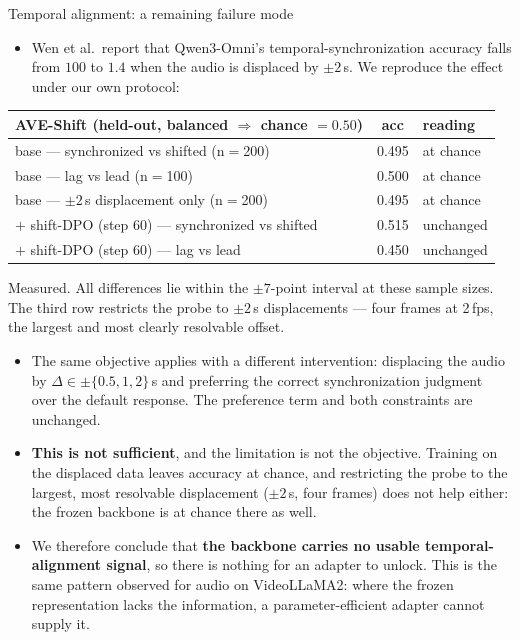 \documentclass[aspectratio=169,11pt]{beamer}
\begin{document}
\begin{frame}{Temporal alignment: a remaining failure mode}
\begin{itemize}\footnotesize
\item Wen et al.\ report that Qwen3-Omni's temporal-synchronization accuracy falls from $100$ to
$1.4$ when the audio is displaced by $\pm2$\,s. We reproduce the effect under our own protocol:
\end{itemize}
\vspace{0.2em}
\centering
\renewcommand{\arraystretch}{1.2}
\footnotesize
\begin{tabular}{l c l}
\toprule
AVE-Shift (held-out, balanced $\Rightarrow$ chance $=0.50$) & acc & reading \\
\midrule
base --- synchronized vs shifted (n$=$200) & 0.495 & at chance \\
base --- lag vs lead (n$=$100)       & 0.500 & at chance \\
base --- $\pm2$\,s displacement only (n$=$200) & 0.495 & at chance \\
\midrule
$+$ shift-DPO (step 60) --- synchronized vs shifted & 0.515 & unchanged \\
$+$ shift-DPO (step 60) --- lag vs lead & 0.450 & unchanged \\
\bottomrule
\end{tabular}
\par\vspace{0.3em}
{\scriptsize Measured. All differences lie within the $\pm7$-point interval at these sample sizes.
The third row restricts the probe to $\pm2$\,s displacements --- four frames at 2\,fps, the largest
and most clearly resolvable offset.}
\vfill
\begin{itemize}\footnotesize
\item The same objective applies with a different intervention: displacing the audio by
$\Delta \in \pm\{0.5,1,2\}$\,s and preferring the correct synchronization judgment over the default
response. The preference term and both constraints are unchanged.
\item \textbf{This is not sufficient}, and the limitation is not the objective. Training on the
displaced data leaves accuracy at chance, and restricting the probe to the largest, most resolvable
displacement ($\pm2$\,s, four frames) does not help either: the frozen backbone is at chance there
as well.
\item We therefore conclude that \textbf{the backbone carries no usable temporal-alignment signal},
so there is nothing for an adapter to unlock. This is the same pattern observed for audio on
VideoLLaMA2: where the frozen representation lacks the information, a parameter-efficient adapter
cannot supply it.
\end{itemize}
\end{frame}
\end{document}
